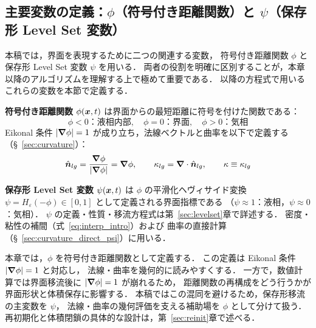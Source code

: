 \subsection{主要変数の定義：\texorpdfstring{$\phi$}{phi}（符号付き距離関数）と \texorpdfstring{$\psi$}{psi}（保存形 Level Set 変数）}
\label{sec:notation}

本稿では，界面を表現するために二つの関連する変数，
符号付き距離関数 $\phi$ と保存形 Level Set 変数 $\psi$ を用いる．
両者の役割を明確に区別することが，本章以降のアルゴリズムを理解する上で極めて重要である．
以降の方程式で用いるこれらの変数を本節で定義する．

\textbf{符号付き距離関数 $\phi(\bm{x}, t)$} は界面からの最短距離に符号を付けた関数である：
\begin{equation}
  \phi < 0\text{：液相内部},\quad \phi = 0\text{：界面},\quad \phi > 0\text{：気相}
  \label{eq:phi_def}
\end{equation}
Eikonal 条件 $|\bm{\nabla}\phi|=1$ が成り立ち，法線ベクトルと曲率を以下で定義する（§~\ref{sec:curvature}）：
\begin{equation}
  \hat{\bm n}_{lg} = \frac{\bm{\nabla}\phi}{|\bm{\nabla}\phi|} = \bm{\nabla}\phi, \qquad
  \kappa_{lg} = \bm{\nabla}\cdot\hat{\bm n}_{lg}, \qquad \kappa \equiv \kappa_{lg}
  \label{eq:kappa_def}
\end{equation}

\textbf{保存形 Level Set 変数 $\psi(\bm{x},t)$} は $\phi$ の平滑化ヘヴィサイド変換
$\psi = H_\varepsilon(-\phi) \in [0,1]$ として定義される界面指標である
（$\psi \approx 1$：液相，$\psi \approx 0$：気相）．
$\psi$ の定義・性質・移流方程式は第~\ref{sec:levelset}章で詳述する．
密度・粘性の補間（式~\eqref{eq:interp_intro}）および
曲率の直接計算（§~\ref{sec:curvature_direct_psi}）に用いる．

\begin{tcolorbox}[defbox, title={距離関数としての $\phi$ と保存変数としての $\psi$}]
本章では，$\phi$ を符号付き距離関数として定義する．
この定義は Eikonal 条件 $|\bm{\nabla}\phi|=1$ と対応し，
法線・曲率を幾何的に読みやすくする．
一方で，数値計算では界面移流後に $|\bm{\nabla}\phi|=1$ が崩れるため，
距離関数の再構成をどう行うかが界面形状と体積保存に影響する．
本稿ではこの混同を避けるため，保存形移流の主変数を $\psi$，
法線・曲率の幾何評価を支える補助場を $\phi$ として分けて扱う．
再初期化と体積閉鎖の具体的な設計は，第~\ref{sec:reinit}章で述べる．
\end{tcolorbox}

